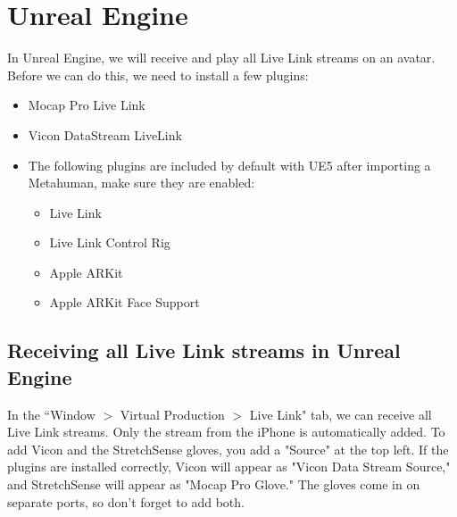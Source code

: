 \documentclass{uva-inf-article}
\begin{document}
\section{Unreal Engine}
In Unreal Engine, we will receive and play all Live Link streams on an avatar. Before we can do this, we need to install a few plugins:
\begin{itemize}
    \item Mocap Pro Live Link
    \item Vicon DataStream LiveLink
    \item The following plugins are included by default with UE5 after importing a Metahuman, make sure they are enabled:
    \begin{itemize}
        \item Live Link
        \item Live Link Control Rig
        \item Apple ARKit
        \item Apple ARKit Face Support
    \end{itemize}
\end{itemize}

\subsection{Receiving all Live Link streams in Unreal Engine}
In the ``Window $>$ Virtual Production $>$ Live Link" tab, we can receive all Live Link streams. Only the stream from the iPhone is automatically added. To add Vicon and the StretchSense gloves, you add a "Source" at the top left. If the plugins are installed correctly, Vicon will appear as "Vicon Data Stream Source," and StretchSense will appear as "Mocap Pro Glove." The gloves come in on separate ports, so don't forget to add both.
\end{document}

